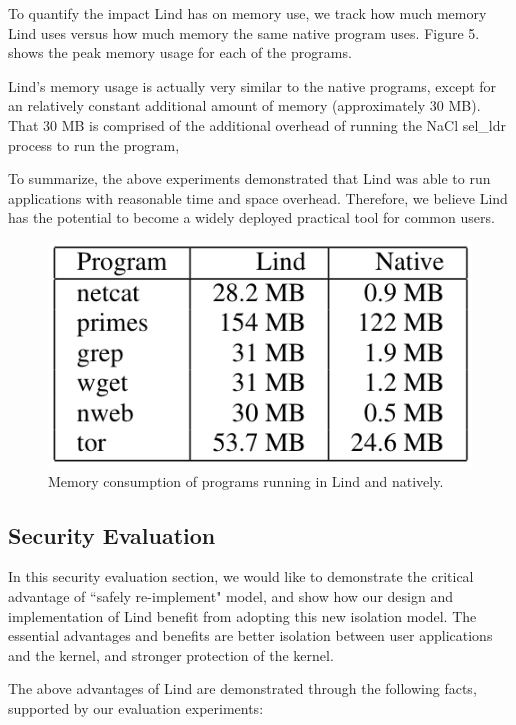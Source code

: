 \par
To quantify the impact Lind has on memory use, we track how much memory Lind uses versus how much memory the same native program uses. Figure 5. shows the peak memory usage for each of the programs.


\par
Lind's memory usage is actually very similar to the native programs, except for an relatively constant additional amount of memory (approximately 30 MB). That 30 MB is comprised of the additional overhead of running the NaCl sel\_ldr process to run the program, 


\par
To summarize, the above experiments demonstrated that Lind was able to run applications with reasonable time and space overhead. Therefore, we believe Lind has the potential to become a widely deployed practical tool for common users. 


\begin{figure}[h]
\centering
\includegraphics[width=0.6\columnwidth]{diagram/evaluation_03.png}
\caption{Memory consumption of programs running in Lind and natively.}
\label{fig:arch}
\end{figure}


\subsection{Security Evaluation}

\par
In this security evaluation section, we would like to demonstrate the critical advantage of ``safely re-implement" model, and show how our design and implementation of Lind benefit from adopting this new isolation model. The essential advantages and benefits are better isolation between user applications and the kernel, and stronger protection of the kernel. 

\par
The above advantages of Lind are demonstrated through the following facts, supported by our evaluation experiments:

